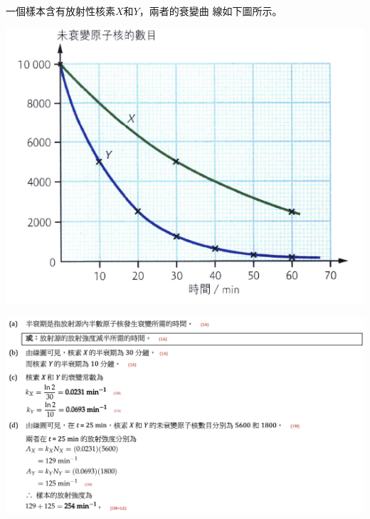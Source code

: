 {
    一個樣本含有放射性核素$X$和$Y$，兩者的衰變曲 線如下圖所示。
    \par{\par\centering\includegraphics[width=.6\textwidth]{./img/ch2_decay_lq_2024-06-17-22-54-20.png}\par}
}{
    \par{\par\centering\includegraphics[width=\textwidth]{./img/ch2_decay_lq_2024-06-17-23-07-32.png}\par}
}

